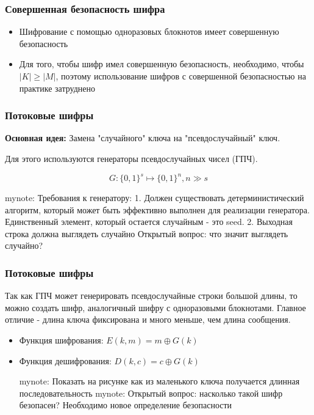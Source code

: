 \documentclass{beamer}
\newcommand{\set}[1]{{\lbrace #1 \rbrace}}
\newcommand{\mynote}[1]{mynote: #1}
\newcommand{\mynote}[1]{}
\begin{document}
\begin{frame}
  \frametitle{Совершенная безопасность шифра}

  \begin{itemize}
    \item{Шифрование с помощью одноразовых блокнотов имеет совершенную безопасность}
    \item{Для того, чтобы шифр имел совершенную безопасность, необходимо, чтобы $|K| \ge |M|$, поэтому использование
          шифров с совершенной безопасностью на практике затруднено}
  \end{itemize}
\end{frame}


\begin{frame}
  \frametitle{Потоковые шифры}

  \textbf{Основная идея:} Замена "случайного" ключа на "псевдослучайный" ключ.
  \vspace{1em}

  Для этого используются генераторы псевдослучайных чисел (ГПЧ).
  \vspace{1em}

  \[G:\set{0,1}^{s} \mapsto \set{0,1}^{n}, n \gg s\]

  \mynote{Требования к генератору: 
    1. Должен существовать детерминистический алгоритм, который может быть эффективно выполнен для реализации генератора.
       Единственный элемент, который остается случайным - это seed.
    2. Выходная строка должна выглядеть случайно
    Открытый вопрос: что значит выглядеть случайно?
  }

\end{frame}


\begin{frame}
  \frametitle{Потоковые шифры}

  Так как ГПЧ может генерировать псевдослучайные строки большой длины, то можно создать шифр,
  аналогичный шифру с одноразовыми блокнотами. Главное отличие - длина ключа фиксирована и много меньше, чем длина
  сообщения.

  \begin{itemize}
    \itemsep 2em
    \item{Функция шифрования: \newline
      $E(k,m)=m \oplus G(k)$}
    \item{Функция дешифрования: \newline
      $D(k,c)=c \oplus G(k)$}

    \mynote{Показать на рисунке как из маленького ключа получается длинная последовательность}
    \mynote{Открытый вопрос: насколько такой шифр безопасен? Необходимо новое определение безопасности}
  \end{itemize}

\end{frame}
\end{document}
